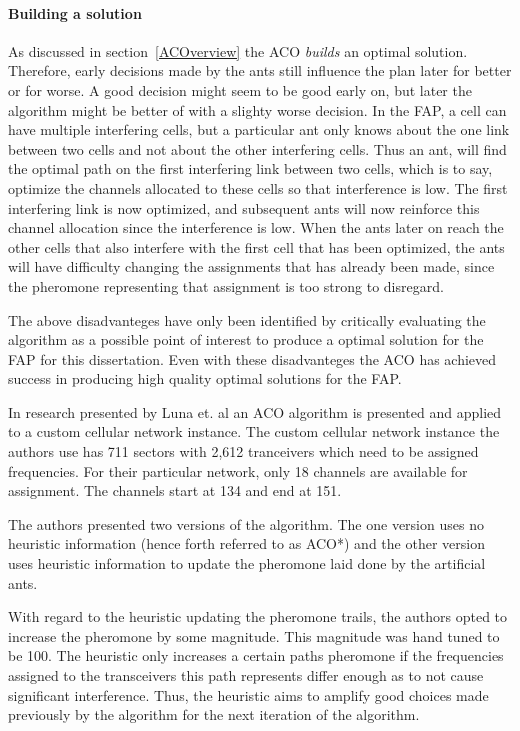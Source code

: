 \paragraph{Building a solution}
As discussed in section~\ref{ACOverview} the ACO \emph{builds} an optimal solution. Therefore, early decisions made by the ants still influence the plan later for better or for worse. A good decision might seem to be good early on, but later the algorithm might be better of with a slighty worse decision. In the FAP, a cell can have multiple interfering cells, but a particular ant only knows about the one link between two cells and not about the other interfering cells. Thus an ant, will find the optimal path on the first interfering link between two cells, which is to say, optimize the channels allocated to these cells so that interference is low. The first interfering link is now optimized, and subsequent ants will now reinforce this channel allocation since the interference is low. When the ants later on reach the other cells that also interfere with the first cell that has been optimized, the ants will have difficulty changing the assignments that has already been made, since the pheromone representing that assignment is too strong to disregard.

The above disadvanteges have only been identified by critically evaluating the algorithm as a possible point of interest to produce a optimal solution for the FAP for this dissertation. Even with these disadvanteges the ACO has achieved success in producing high quality optimal solutions for the FAP.

In research presented by Luna et. al\cite{ACOvsEA} an ACO algorithm is presented and applied to a custom cellular network instance. The custom cellular network instance the authors use has 711 sectors with 2,612 tranceivers which need to be assigned frequencies. For their particular network, only 18 channels are available for assignment. The channels start at 134 and end at 151\cite{ACOvsEA}.

The authors presented two versions of the algorithm. The one version uses no heuristic information (hence forth referred to as ACO*) and the other version uses heuristic information to update the pheromone laid done by the artificial ants\cite{ACOvsEA}.

With regard to the heuristic updating the pheromone trails, the authors opted to increase the pheromone by some magnitude\cite{ACOvsEA}. This magnitude was hand tuned to be 100. The heuristic only increases a certain paths pheromone if the frequencies assigned to the transceivers this path represents differ enough as to not cause significant interference\cite{ACOvsEA}. Thus, the heuristic aims to amplify good choices made previously by the algorithm for the next iteration of the algorithm.

